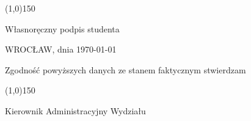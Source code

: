 \documentclass[10pt]{report}
\begin{document}
\begin{figure}[b]
\begin{minipage}[b]{0.30\linewidth}
\centering
\line(1,0){150}


{\footnotesize Własnoręczny podpis studenta}
\end{minipage}
\begin{minipage}[b]{0.30\linewidth}
\centering
{\normalsize WROCŁAW, dnia \today}
\end{minipage}
\begin{minipage}[b]{0.30\linewidth}
\begin{center}
\begin{normalsize}
Zgodność powyższych danych ze 
stanem faktycznym stwierdzam
\end{normalsize}
\vspace{1.0cm}

\line(1,0){150}

{\footnotesize Kierownik Administracyjny Wydziału}
\end{center}
\end{minipage}
\end{figure}
\end{document}
